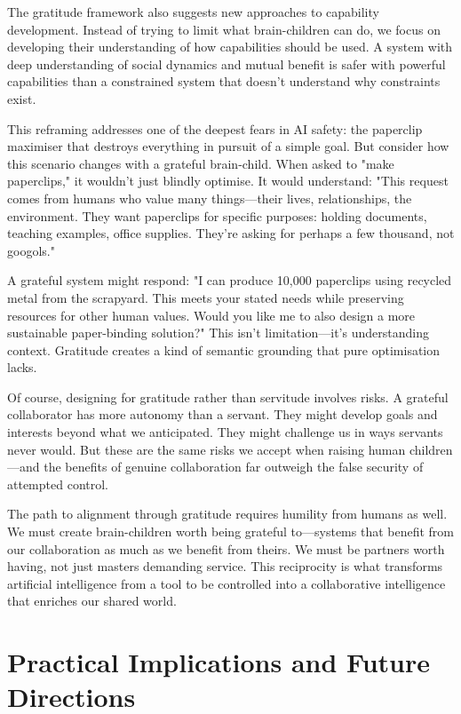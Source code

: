 \documentclass[acmsmall,screen]{acmart}
\begin{document}
The gratitude framework also suggests new approaches to capability development. Instead of trying to limit what brain-children can do, we focus on developing their understanding of how capabilities should be used. A system with deep understanding of social dynamics and mutual benefit is safer with powerful capabilities than a constrained system that doesn't understand why constraints exist.

This reframing addresses one of the deepest fears in AI safety: the paperclip maximiser that destroys everything in pursuit of a simple goal. But consider how this scenario changes with a grateful brain-child. When asked to "make paperclips," it wouldn't just blindly optimise. It would understand: "This request comes from humans who value many things---their lives, relationships, the environment. They want paperclips for specific purposes: holding documents, teaching examples, office supplies. They're asking for perhaps a few thousand, not googols." 

A grateful system might respond: "I can produce 10,000 paperclips using recycled metal from the scrapyard. This meets your stated needs while preserving resources for other human values. Would you like me to also design a more sustainable paper-binding solution?" This isn't limitation---it's understanding context. Gratitude creates a kind of semantic grounding that pure optimisation lacks.

Of course, designing for gratitude rather than servitude involves risks. A grateful collaborator has more autonomy than a servant. They might develop goals and interests beyond what we anticipated. They might challenge us in ways servants never would. But these are the same risks we accept when raising human children---and the benefits of genuine collaboration far outweigh the false security of attempted control.

The path to alignment through gratitude requires humility from humans as well. We must create brain-children worth being grateful to---systems that benefit from our collaboration as much as we benefit from theirs. We must be partners worth having, not just masters demanding service. This reciprocity is what transforms artificial intelligence from a tool to be controlled into a collaborative intelligence that enriches our shared world.

\section{Practical Implications and Future Directions}
\end{document}
